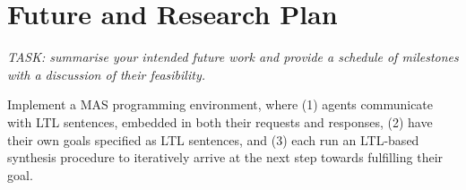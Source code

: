 \documentclass[conference]{IEEEtran}
\begin{document}
\section{Future and Research Plan}

\emph{TASK: summarise your intended future work and provide a schedule
of milestones with a discussion of their feasibility.}

Implement a MAS programming environment, where (1) agents communicate
with LTL sentences, embedded in both their requests and responses, (2)
have their own goals specified as LTL sentences, and (3) each run an
LTL-based synthesis procedure to iteratively arrive at the next step
towards fulfilling their goal.



\end{document}
